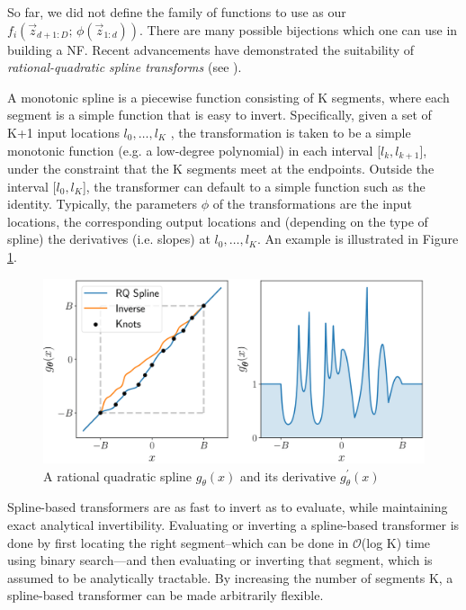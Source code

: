 So far, we did not define the family of functions to use as our $ f_i(\vec z_{d+1:D}; \, \phi(\vec z_{1:d}))$.
There are many possible bijections which one can use in building a NF. Recent advancements have demonstrated the suitability of \emph{rational-quadratic spline transforms} (see \cite{durkan}). 

A monotonic spline is a piecewise function consisting of K segments, where each segment is a simple function that is easy to invert. Specifically, given a set of K+1 input locations $l_{0}, \dots, l_K$ , the transformation
is taken to be a simple monotonic function (e.g. a low-degree polynomial) in each interval
[$l_{k}, l_{k+1}$], under the constraint that the K segments meet at the endpoints.
Outside the interval [$l_{0}, l_K$], the transformer can default to a simple function such as the
identity. Typically, the parameters $\phi$ of the transformations are the input locations, 
the corresponding output locations and (depending on the type of spline) the
derivatives (i.e. slopes) at $l_{0}, \dots, l_K$. An example is illustrated in Figure \ref{fig:rqs}.

\begin{figure}
    \centering
    \includegraphics[width=\columnwidth]{gfx/ch4/D9F0PDyWsAAWKHf.png}
    \caption[Rational quadratic spline]{A rational quadratic spline $g_{\theta}(x)$ and its derivative $g_{\theta}^{'}(x)$}
    \label{fig:rqs}
\end{figure}

Spline-based transformers are as fast to invert as to evaluate, while
maintaining exact analytical invertibility. Evaluating or inverting a spline-based transformer
is done by first locating the right segment--which can be done in $\mathcal{O}$(log K) time using binary
search—and then evaluating or inverting that segment, which is assumed to be analytically
tractable. By increasing the number of segments K, a spline-based transformer can be
made arbitrarily flexible.

